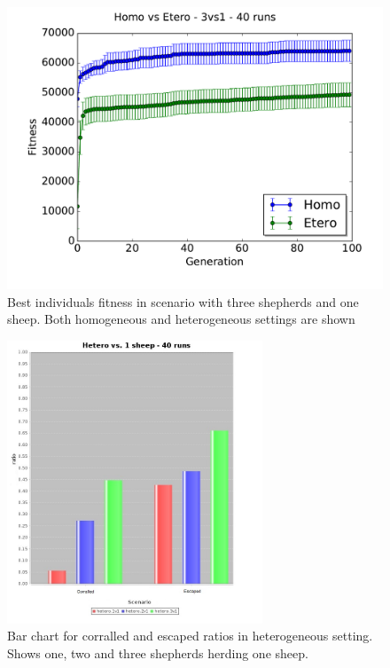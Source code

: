 \documentclass[conference]{IEEEtran}
\begin{document}
\begin{figure}[ht]
	\centering
	\includegraphics[width=1\hsize]{imgs/homo3v1-hetero3v1-bestSoFar.pdf}
	\caption{Best individuals fitness in scenario with three shepherds and one sheep. Both homogeneous and heterogeneous settings are shown}
	\label{fig:3v1_homo_vs_hetero}
\end{figure}


\begin{figure}[ht]
	\centering
	\includegraphics[width=3in]{imgs/hetero_1v1-hetero_2v1-hetero_3v1-ratio-bar.jpg}
	\caption{Bar chart for corralled and escaped ratios in heterogeneous setting. Shows one, two and three shepherds herding one sheep.}
	\label{fig:ratios_oneSheep}
\end{figure}
\end{document}
